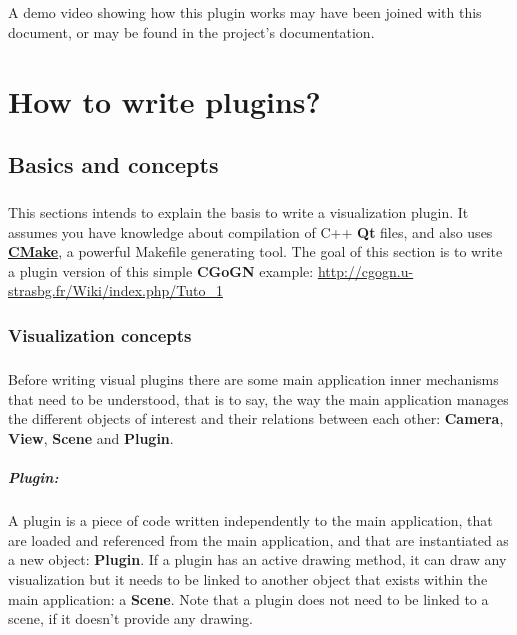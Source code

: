\documentclass[a4paper]{scrreprt}
\begin{document}
	\FloatBarrier
	
	\paragraph{}
	A demo video showing how this plugin works may have been joined with this
	document, or may be found in the project's documentation.
	
	
\chapter{How to write plugins?}
\section{Basics and concepts}
	\paragraph{}
	This sections intends to explain the basis to write a visualization plugin. It
	assumes you have knowledge about compilation of C++ \textbf{Qt} files, and also
	uses \href{http://www.cmake.org/}{\textbf{CMake}}, a powerful Makefile
	generating tool. The goal of this section is to write a plugin version of this
	simple \textbf{CGoGN} example:
	\url{http://cgogn.u-strasbg.fr/Wiki/index.php/Tuto_1}
	
\subsection{Visualization concepts}
	\paragraph{}
	Before writing visual plugins there are some main application inner mechanisms
	that need to be understood, that is to say, the way the main application
	manages the different objects of interest and their relations between each
	other: \textbf{Camera}, \textbf{View}, \textbf{Scene} and \textbf{Plugin}.
	\paragraph{Plugin:}
	A plugin is a piece of code written independently to the main application,
	that are loaded and referenced from the main application, and that are
	instantiated as a new object: \textbf{Plugin}. If a plugin has an active
	drawing method, it can draw any visualization but it needs to be linked to
	another object that exists within the main application: a \textbf{Scene}. Note
	that a plugin does not need to be linked to a scene, if it doesn't provide any
	drawing.
\end{document}
